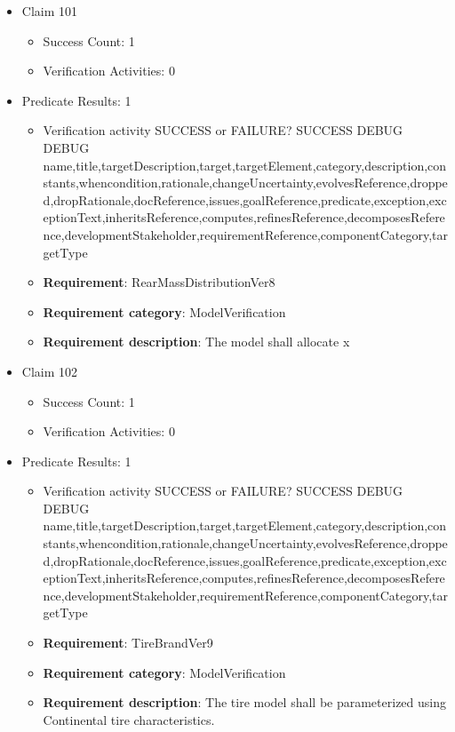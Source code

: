 \documentclass{article}
\begin{document}
\begin{itemize}
  				  \item Claim 101
				\begin{itemize}
			    	\item Success Count: 1 
			    	\item Verification Activities: 0
				\end{itemize}
				
									    
				\item Predicate Results: 1
					\begin{itemize}				
					\item Verification activity SUCCESS or FAILURE? SUCCESS
					DEBUG DEBUG name,title,targetDescription,target,targetElement,category,description,constants,whencondition,rationale,changeUncertainty,evolvesReference,dropped,dropRationale,docReference,issues,goalReference,predicate,exception,exceptionText,inheritsReference,computes,refinesReference,decomposesReference,developmentStakeholder,requirementReference,componentCategory,targetType
					\item \textbf{Requirement}: RearMassDistributionVer8 
					\item \textbf{Requirement category}: ModelVerification
					\item \textbf{Requirement description}: The model shall allocate x%
					\end{itemize}

  				  \item Claim 102
				\begin{itemize}
			    	\item Success Count: 1 
			    	\item Verification Activities: 0
				\end{itemize}
				
									    
				\item Predicate Results: 1
					\begin{itemize}				
					\item Verification activity SUCCESS or FAILURE? SUCCESS
					DEBUG DEBUG name,title,targetDescription,target,targetElement,category,description,constants,whencondition,rationale,changeUncertainty,evolvesReference,dropped,dropRationale,docReference,issues,goalReference,predicate,exception,exceptionText,inheritsReference,computes,refinesReference,decomposesReference,developmentStakeholder,requirementReference,componentCategory,targetType
					\item \textbf{Requirement}: TireBrandVer9 
					\item \textbf{Requirement category}: ModelVerification
					\item \textbf{Requirement description}: The tire model shall be parameterized using Continental tire characteristics.
					\end{itemize}


\end{itemize}
\end{document}
